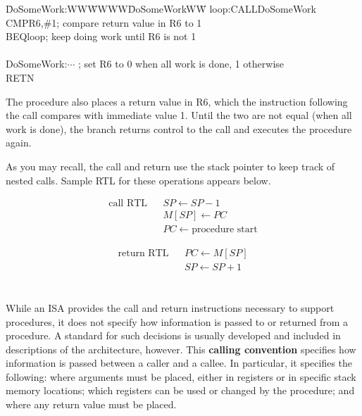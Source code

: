 \vspace{-6pt}
\begin{tabbing}
\hspace{.5in}\=DoSomeWork:WW\=WWWW\=DoSomeWorkWW\= \kill
\>loop:\>CALL\>DoSomeWork\\
\>\>CMP\>R6,\#1\>; compare return value in R6 to 1\\
\>\>BEQ\>loop\>; keep doing work until R6 is not 1\\
\\
\>DoSomeWork:\>$\cdots$\>\> ; set R6 to 0 when all work is done, 1 otherwise \\
\>\>RETN
\end{tabbing}
\vspace{-6pt}

The procedure also places a return value in R6, which the instruction
following the call compares with immediate value 1.  Until the two are
not equal (when all work is done), the branch returns control to the
call and executes the procedure again.

As you may recall, the call and return use the stack pointer to keep
track of nested calls.  Sample RTL for these operations appears below.\\
%
\begin{minipage}{3.25in}
\begin{eqnarray*}
\mbox{call RTL}&&SP \leftarrow SP - 1\\
&& M[SP] \leftarrow PC\\
&& PC \leftarrow \mbox{procedure start}
\end{eqnarray*}
\end{minipage}%
\begin{minipage}{3.25in}
\begin{eqnarray*}
\mbox{return RTL}&&PC \leftarrow M[SP]\\
&&SP \leftarrow SP + 1\\
\end{eqnarray*}
\end{minipage}\\

While an ISA provides the call and return instructions necessary to
support procedures, it does not specify how information is passed to
or returned from a procedure.  A standard for such decisions is
usually developed and included in descriptions of the architecture,
however.  This {\bf calling convention} specifies how information is
passed between a caller and a callee.  In particular, it specifies the
following: where arguments must be placed, either in registers or in
specific stack memory locations; which registers can be used or
changed by the procedure; and where any return value must be placed.

